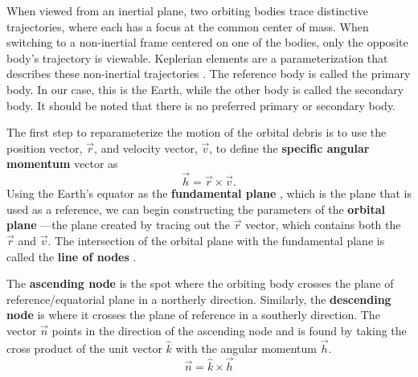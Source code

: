\documentclass[a4paper, 12pt]{article}
\newcommand{\lindex}[1]{%
	\lowercase{\def\temp{#1}}%
	\expandafter\index\expandafter{\temp}%
}
\newcommand{\boldindex}[1]{%
	\textbf{#1}\lindex{#1}%
}
\begin{document}
When viewed from an inertial plane, two orbiting bodies trace distinctive trajectories, where each has a focus at the common center of mass.  When switching to a non-inertial frame centered on one of the bodies, only the opposite body's trajectory is viewable. Keplerian elements are a parameterization that describes these non-inertial trajectories \citep{noauthor_astrodynamicsclassical_nodate}. The reference body is called the primary body. In our case, this is the Earth, while the other body is called the secondary body. It should be noted that there is no preferred primary or secondary body.

The first step to reparameterize the motion of the orbital debris is to use the position vector, $\vec{r}$, and velocity vector, $\vec{v}$, to define the \boldindex{specific angular momentum} vector as
\begin{equation}
\vec{h} = \vec{r} \times \vec{v}.
\end{equation}
Using the Earth's equator as the \boldindex{fundamental plane}, which is the plane that is used as a reference, we can begin constructing the parameters of the \boldindex{orbital plane}---the plane created by tracing out the $\vec{r}$ vector, which contains both the $\vec{r}$ and $\vec{v}$. The intersection of the orbital plane with the fundamental plane is called the \boldindex{line of nodes}.

The \boldindex{ascending node} is the spot where the orbiting body crosses the plane of reference/equatorial plane in a northerly direction. Similarly, the \boldindex{descending node} is where it crosses the plane of reference in a southerly direction. The vector $\vec{n}$ points in the direction of the ascending node and is found by taking the cross product of the unit vector $\hat{k}$ with the angular momentum $\vec{h}$.
\begin{equation}
\vec{n} = \hat{k} \times \vec{h}
\end{equation}
\end{document}
